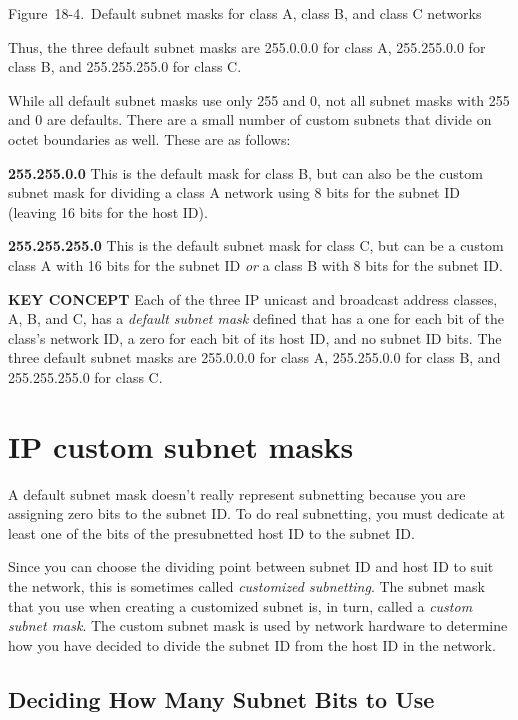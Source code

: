 Figure~18-4.~Default subnet masks for class A, class B, and class C
networks

\protect\hypertarget{ch18s04.htmlux5cux23idx-CHP-18-0735}{}{}Thus, the
three default subnet masks are 255.0.0.0 for class A, 255.255.0.0 for
class B, and 255.255.255.0 for class C.

While all default subnet masks use only 255 and 0, not all subnet masks
with 255 and 0 are defaults. There are a small number of custom subnets
that divide on octet boundaries as well. These are as follows:

{\textbf{255.255.0.0}} This is the default mask for class B, but can
also be the custom subnet mask for dividing a class A network using 8
bits for the subnet ID (leaving 16 bits for the host ID).

{\textbf{255.255.255.0}} This is the default subnet mask for class C,
but can be a custom class A with 16 bits for the subnet ID {\emph{or}} a
class B with 8 bits for the subnet ID.


{\textbf{KEY CONCEPT}} Each of the three IP unicast and broadcast
address classes, A, B, and C, has a {\emph{default subnet mask}} defined
that has a one for each bit of the class's network ID, a zero for each
bit of its host ID, and no subnet ID bits. The three default subnet
masks are 255.0.0.0 for class A, 255.255.0.0 for class B, and
255.255.255.0 for class C.



\section{IP custom subnet masks}

A default subnet mask doesn't really represent subnetting because you
are assigning zero bits to the subnet ID. To do real subnetting, you
must dedicate at least one of the bits of the presubnetted host ID to
the subnet ID.

Since you can choose the dividing point between subnet ID and host ID to
suit the network, this is sometimes called
\protect\hypertarget{ch18s05.htmlux5cux23idx-CHP-18-0736}{}{}{\emph{customized
subnetting}}. The subnet mask that you use when creating a customized
subnet is, in turn, called a {\emph{custom subnet mask}}. The custom
subnet mask is used by network hardware to determine how you have
decided to divide the subnet ID from the host ID in the network.



\subsection{Deciding How Many Subnet Bits to Use}

